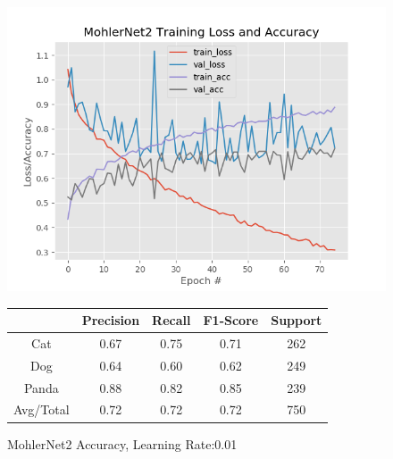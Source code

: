 \documentclass[12pt]{article}
\begin{document}
\begin{figure}[h]
	\centering %
	\captionsetup{justification=centering}
	\begin{minipage}{0.5\textwidth}
		\centering %
		\includegraphics[width=1\textwidth]{MohlerNet2_opt-SGD_KEEP.png}
		\caption{MohlerNet2 Accuracy, Learning Rate:0.01} \label{MN2}
	\end{minipage}\hfill
	\begin{minipage}{0.5\textwidth}
		\begin{center}
			\begin{tabular}[5pt]{| c| c| c| c|c|}
				\hline
					& Precision & Recall & F1-Score & Support \\[0.5ex] 
				\hline 	
				 Cat   &    0.67  &    0.75   &   0.71   &    262\\ \hline 
				 Dog    &   0.64    &  0.60   &   0.62   &    249\\ \hline 
				 Panda   &    0.88   &  0.82 &     0.85  &     239\\ \hline 
				 Avg/Total  &     0.72    &  0.72 &     0.72    &   750\\ \hline 

			\end{tabular}
			\label{MNR}
		\end{center}	
	\end{minipage}
\end{figure}
\end{document}
